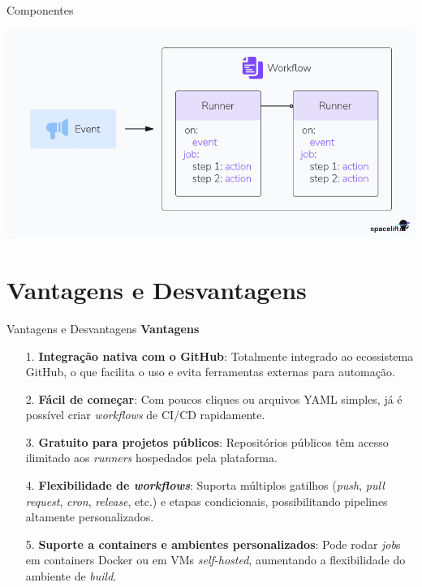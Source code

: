 \documentclass[t,serif]{beamer}
\begin{document}
	\begin{frame}{Componentes}
		\begin{center}
			\includegraphics[width=\linewidth]{figs/3_2.png}
		\end{center}
	\end{frame}
	
\section{Vantagens e Desvantagens}
	\begin{frame}{Vantagens e Desvantagens}
		\textbf{Vantagens}
		\begin{enumerate}
			\item[1.] \textbf{Integração nativa com o GitHub}: Totalmente integrado ao ecossistema GitHub, o que facilita o uso e evita ferramentas externas para automação.
			\item[2.] \textbf{Fácil de começar}: Com poucos cliques ou arquivos YAML simples, já é possível criar \textit{workflows} de CI/CD rapidamente.
			\item[3.] \textbf{Gratuito para projetos públicos}: Repositórios públicos têm acesso ilimitado aos \textit{runners} hospedados pela plataforma.
			\item[4.] \textbf{Flexibilidade de \textit{workflows}}: Suporta múltiplos gatilhos (\textit{push}, \textit{pull request}, \textit{cron}, \textit{release}, etc.) e etapas condicionais, possibilitando pipelines altamente personalizados.
			\item[5.] \textbf{Suporte a containers e ambientes personalizados}: Pode rodar \textit{job}s em containers Docker ou em VMs \textit{self-hosted}, aumentando a flexibilidade do ambiente de \textit{build}.
		\end{enumerate}
	\end{frame}
	
\end{document}
